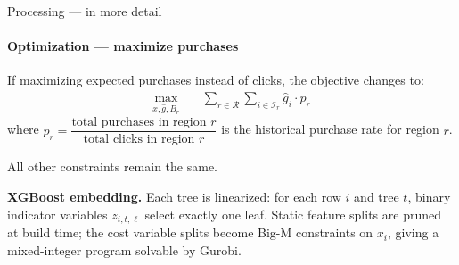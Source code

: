 \documentclass[smaller]{beamer}
\begin{document}
\begin{frame}{Processing --- in more detail}
\framesubtitle{Optimization --- maximize purchases}

If maximizing expected purchases instead of clicks, the objective changes to:
\begin{align*}
    \max_{x,\hat{g}, B_r} \quad & \sum_{r \in \mathcal{R}} \sum_{i \in \mathcal{I}_r} \hat{g}_i \cdot p_r
\end{align*}
where $p_r = \dfrac{\text{total purchases in region } r}{\text{total clicks in region } r}$ is the historical purchase rate for region $r$.

\medskip
All other constraints remain the same.

\medskip
\textbf{XGBoost embedding.} Each tree is linearized: for each row $i$ and tree $t$, binary indicator variables $z_{i,t,\ell}$ select exactly one leaf. Static feature splits are pruned at build time; the cost variable splits become Big-M constraints on $x_i$, giving a mixed-integer program solvable by Gurobi.
\end{frame}

\fi
\end{document}
